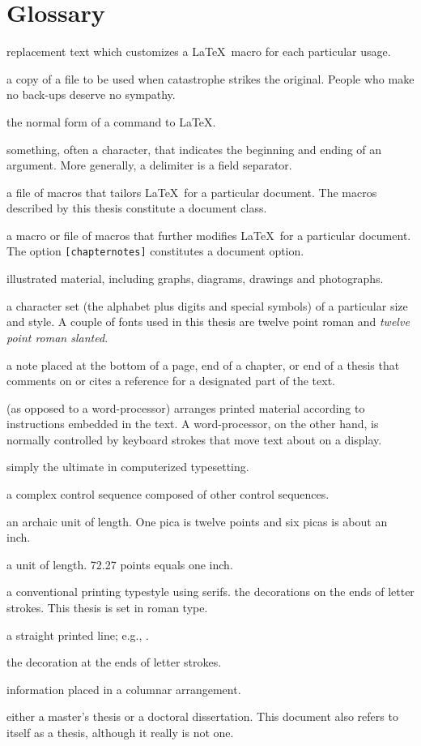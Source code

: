 \documentclass [11pt, proquest] {uwthesis}[2016/11/22]
\begin{document}
\chapter*{Glossary}      %
\thispagestyle{plain}
%
\begin{glossary}
\item[argument] replacement text which customizes a \LaTeX\ macro for
each particular usage.
\item[back-up] a copy of a file to be used when catastrophe strikes
the original.  People who make no back-ups deserve
no sympathy.
\item[control sequence] the normal form of a command to \LaTeX.
\item[delimiter] something, often a character, that indicates
the beginning and ending of an argument.
More generally, a delimiter is a field separator.
\item[document class] a file of macros that tailors \LaTeX\ for
a particular document.  The macros described by this thesis
constitute a document class.
\item[document option] a macro or file of macros
that further modifies \LaTeX\ for
a particular document.  The option {\tt[chapternotes]}
constitutes a document option.
\item[figure] illustrated material, including graphs,
diagrams, drawings and photographs.
\item[font] a character set (the alphabet plus digits
and special symbols) of a particular size and style.  A couple of fonts
used in this thesis are twelve point roman and {\sl twelve point roman
slanted}.
\item[footnote] a note placed at the bottom of a page, end of a chapter,
or end of a thesis that comments on or cites a reference
for a designated part of the text.
\item[formatter] (as opposed to a word-processor) arranges printed
material according to instructions embedded in the text.
A word-processor, on the other hand, is normally controlled
by keyboard strokes that move text about on a display.
\item[\LaTeX] simply the ultimate in computerized typesetting.
\item[macro]  a complex control sequence composed of 
other control sequences.
\item[pica] an archaic unit of length.  One pica is twelve points and
six picas is about an inch.
\item[point] a unit of length.  72.27 points equals one inch.
\item[roman]  a conventional printing typestyle using serifs.
the decorations on the ends of letter strokes.
This thesis is set in roman type.
\item[rule] a straight printed line; e.g., \hrulefill.
\item[serif] the decoration at the ends of letter strokes.
\item[table] information placed in a columnar arrangement.
\item[thesis] either a master's thesis or a doctoral dissertation.
This document also refers to itself as a thesis, although it
really is not one.
 

\end{glossary}
\end{document}
